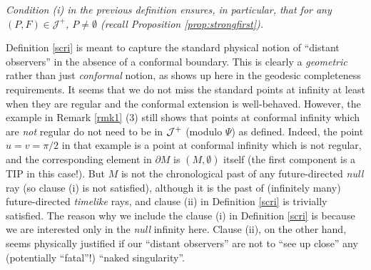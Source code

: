 \begin{remark}\label{rem:1}
  \em Condition (i) in the previous definition ensures, in particular, that for any $(P,F)\in \mathcal{J}^{+}$, $P\neq \emptyset$ (recall Proposition \ref{prop:strongfirst}).
\end{remark}
Definition \ref{scri} is meant to capture the standard physical notion of ``distant observers'' in the absence of a conformal boundary. This is clearly a {\em geometric} rather than just {\em conformal} notion, as shows up here in the geodesic completeness requirements. It seems that we do not miss the standard points at infinity at least when they are regular and the conformal extension is well-behaved. However, the example in Remark \ref{rmk1} (3) still shows that points at conformal infinity which are {\em not} regular do not need to be in ${\cal J}^+$ (modulo $\Psi$) as defined. Indeed, the point $u=v=\pi/2$ in that example is a point at conformal infinity which is not regular, and the corresponding element in $\partial  M$ is $(M,\emptyset)$ itself (the first component is a TIP in this case!). But $M$ is not the chronological past of any future-directed {\em null} ray (so clause (i) is not satisfied), although it is the past of (infinitely many) future-directed {\em timelike} rays, and clause (ii) in Definition \ref{scri} is trivially satisfied. The reason why we include the clause (i) in Definition \ref{scri} is because we are interested only in the {\em null} infinity here. Clause (ii), on the other hand, seems physically justified if our ``distant observers'' are not to ``see up close'' any (potentially ``fatal''!) ``naked singularity''.


